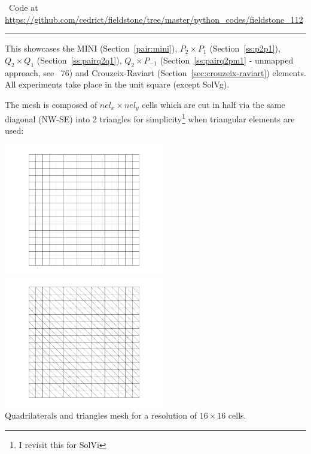 

\begin{center}
\inpython~Code at \url{https://github.com/cedrict/fieldstone/tree/master/python_codes/fieldstone_112}
\end{center}

\par\noindent\rule{\textwidth}{0.4pt}


This \stone showcases the MINI (Section~\ref{pair:mini}), 
$P_2\times P_1$ (Section~\ref{ss:p2p1}), $Q_2\times Q_1$ (Section~\ref{ss:pairq2q1}), 
$Q_2\times P_{-1}$ (Section~\ref{ss:pairq2pm1} - unmapped approach, see \stone~76) 
and Crouzeix-Raviart  (Section~\ref{sec:crouzeix-raviart}) elements.
All experiments take place in the unit square (except SolVg). 

The mesh is composed of $nel_x \times nel_y$ cells which are cut in half via the same 
diagonal (NW-SE) into 2 triangles for simplicity\footnote{I revisit this for SolVi} 
when triangular elements are used: 

\begin{center}
\includegraphics[width=7cm]{python_codes/fieldstone_112/results/exp1/grid_quads}
\includegraphics[width=7cm]{python_codes/fieldstone_112/results/exp1/grid_triangles}\\
{\captionfont Quadrilaterals and triangles mesh for a resolution of $16\times 16$ cells.} 
\end{center}

